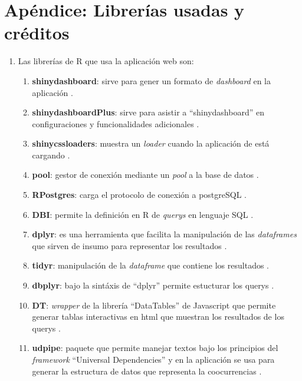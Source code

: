 \documentclass[
  12pt,
  openany]{book}
\begin{document}
\hypertarget{apuxe9ndice-libreruxedas-usadas-y-cruxe9ditos}{%
\chapter*{Apéndice: Librerías usadas y créditos}\label{apuxe9ndice-libreruxedas-usadas-y-cruxe9ditos}}

\begin{enumerate}
\def\labelenumi{\arabic{enumi}.}
\item
  Las librerías de R que usa la aplicación web son:

  \begin{enumerate}
  \def\labelenumii{\arabic{enumii}.}
  \item
    \textbf{shinydashboard}: sirve para gener un formato de \emph{dashboard} en la aplicación \citep{shinydashboard}.
  \item
    \textbf{shinydashboardPlus}: sirve para asistir a ``shinydashboard'' en configuraciones y funcionalidades adicionales \citep{shinydashboardPlus}.
  \item
    \textbf{shinycssloaders}: muestra un \emph{loader} cuando la aplicación de está cargando \citep{shinycssloaders}.
  \item
    \textbf{pool}: gestor de conexión mediante un \emph{pool} a la base de datos \citep{pool}.
  \item
    \textbf{RPostgres}: carga el protocolo de conexión a postgreSQL \citep{RPostgres}.
  \item
    \textbf{DBI}: permite la definición en R de \emph{querys} en lenguaje SQL \citep{DBI}.
  \item
    \textbf{dplyr}: es una herramienta que facilita la manipulación de las \emph{dataframes} que sirven de insumo para representar los resultados \citep{dplyr}.
  \item
    \textbf{tidyr}: manipulación de la \emph{dataframe} que contiene los resultados \citep{tidyr}.
  \item
    \textbf{dbplyr}: bajo la sintáxis de ``dplyr'' permite estucturar los querys \citep{dbplyr}.
  \item
    \textbf{DT}: \emph{wrapper} de la librería ``DataTables'' de Javascript que permite generar tablas interactivas en html que muestran los resultados de los querys \citep{DT-2}.
  \item
    \textbf{udpipe}: paquete que permite manejar textos bajo los principios del \emph{framework} ``Universal Dependencies'' y en la aplicación se usa para generar la estructura de datos que representa la coocurrencias \citep{udpipe-3}.

\end{enumerate}
\end{enumerate}
\end{document}
